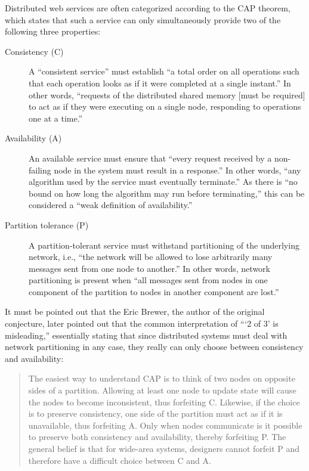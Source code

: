 Distributed web services are often categorized according to the CAP theorem, which states that such a service can only simultaneously provide two of the following three properties: \autocite{gilbert2002}

\begin{description}
\item[Consistency (C)]
A ``consistent service'' must establish ``a total order on all operations such that each operation looks as if it were completed at a single instant.''
In other words, ``requests of the distributed shared memory [must be required] to act as if they were executing on a single node, responding to operations one at a time.''
\item[Availability (A)]
An available service must ensure that ``every request received by a non-failing node in the system must result in a response.''
In other words, ``any algorithm used by the service must eventually terminate.''
As there is ``no bound on how long the algorithm may run before terminating,'' this can be considered a ``weak definition of availability.''
\item[Partition tolerance (P)]
A partition-tolerant service must withstand partitioning of the underlying network, i.e., ``the network will be allowed to lose arbitrarily many messages sent from one node to another.''
In other words, network partitioning is present when ``all messages sent from nodes in one component of the partition to nodes in another component are lost.''
\end{description}

It must be pointed out that the Eric Brewer, the author of the original conjecture, later pointed out that the common interpretation of \enquote{\enquote{2 of 3} is misleading,} essentially stating that since distributed systems must deal with network partitioning in any case, they really can only choose between consistency and availability: \autocite{infoq2012caplater}

\begin{quote}
  The easiest way to understand CAP is to think of two nodes on opposite sides of a partition. Allowing at least one node to update state will cause the nodes to become inconsistent, thus forfeiting C.
  Likewise, if the choice is to preserve consistency, one side of the partition must act as if it is unavailable, thus forfeiting A.
  Only when nodes communicate is it possible to preserve both consistency and availability, thereby forfeiting P.
  The general belief is that for wide-area systems, designers cannot forfeit P and therefore have a difficult choice between C and A.
\end{quote}

